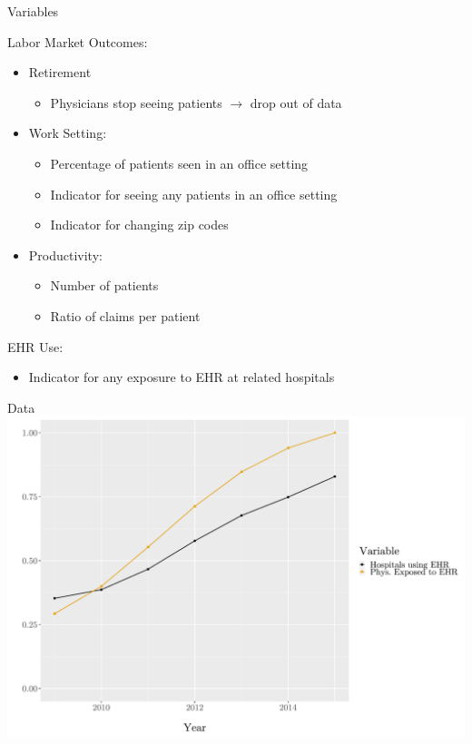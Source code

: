 \documentclass[10pt]{beamer}
\begin{document}
\begin{frame}{Variables}

Labor Market Outcomes:
\begin{itemize}
    \item Retirement
    \begin{itemize}
        \item Physicians stop seeing patients $\rightarrow$ drop out of data
    \end{itemize}
    
    \item Work Setting:
    \begin{itemize}
        \item Percentage of patients seen in an office setting
        \item Indicator for seeing any patients in an office setting
        \item Indicator for changing zip codes
    \end{itemize}
    
    \item Productivity:
    \begin{itemize}
        \item Number of patients
        \item Ratio of claims per patient
    \end{itemize}
\end{itemize}

EHR Use:
\vspace{-2mm}
\begin{itemize}
    \item Indicator for any exposure to EHR at related hospitals
\end{itemize}

\end{frame}


\begin{frame}{Data}
    \centering
    \includegraphics[scale=.4]{Objects/sum_stats_year.pdf}
\end{frame}
\end{document}
